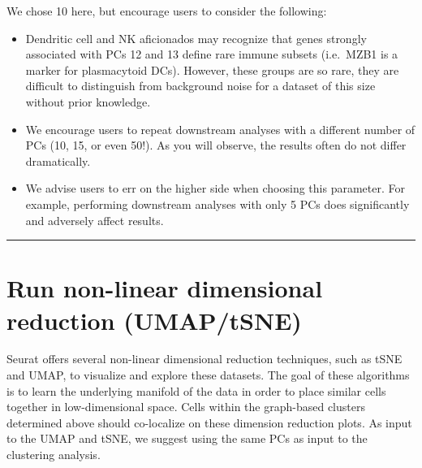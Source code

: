 \documentclass[
]{book}
\providecommand{\tightlist}{%
  \setlength{\itemsep}{0pt}\setlength{\parskip}{0pt}}
\begin{document}
We chose 10 here, but encourage users to consider the following:

\begin{itemize}
\tightlist
\item
  Dendritic cell and NK aficionados may recognize that genes strongly associated with PCs 12 and 13 define rare immune subsets (i.e.~MZB1 is a marker for plasmacytoid DCs). However, these groups are so rare, they are difficult to distinguish from background noise for a dataset of this size without prior knowledge.
\item
  We encourage users to repeat downstream analyses with a different number of PCs (10, 15, or even 50!). As you will observe, the results often do not differ dramatically.
\item
  We advise users to err on the higher side when choosing this parameter. For example, performing downstream analyses with only 5 PCs does significantly and adversely affect results.
\end{itemize}

\begin{center}\rule{0.5\linewidth}{0.5pt}\end{center}

\hypertarget{run-non-linear-dimensional-reduction-umaptsne}{%
\section{Run non-linear dimensional reduction (UMAP/tSNE)}\label{run-non-linear-dimensional-reduction-umaptsne}}

Seurat offers several non-linear dimensional reduction techniques, such as tSNE and UMAP, to visualize and explore these datasets. The goal of these algorithms is to learn the underlying manifold of the data in order to place similar cells together in low-dimensional space. Cells within the graph-based clusters determined above should co-localize on these dimension reduction plots. As input to the UMAP and tSNE, we suggest using the same PCs as input to the clustering analysis.
\end{document}
